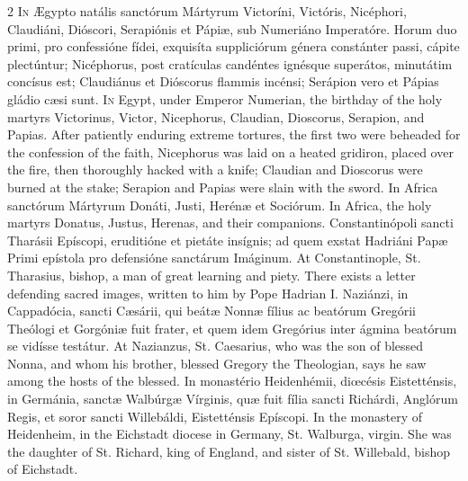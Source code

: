 \begin{paracol}{2}
\lettrine[lines=2]{I}{n} Ægypto natális sanctórum Mártyrum Victoríni, 
 Victóris, Nicéphori, Claudiáni, Dióscori, Serapiónis et Pápiæ, sub Numeriáno 
 Imperatóre. Horum duo primi, pro confessióne fídei, exquisíta 
 suppliciórum génera constánter passi, cápite plectúntur; Nicéphorus, post 
 cratículas candéntes ignésque superátos, minutátim concísus est; Claudiánus 
 et Dióscorus flammis incénsi; Serápion vero et Pápias gládio cæsi sunt.
\switchcolumn
{}
\lettrine[lines=2]{I}{n} Egypt, under Emperor Numerian, the birthday of the holy martyrs 
 Victorinus, Victor, Nicephorus, Claudian, Dioscorus, Serapion, and Papias. 
 After patiently enduring extreme tortures, the first two were beheaded for 
 the confession of the faith, Nicephorus was laid on a heated gridiron, 
 placed over the fire, then thoroughly hacked with a knife; Claudian and 
 Dioscorus were burned at the stake; Serapion and Papias were slain with the 
 sword.
\switchcolumn*
{}
In Africa sanctórum Mártyrum Donáti, Justi, Herénæ 
 et Sociórum.
\switchcolumn
{}
In Africa, the holy martyrs Donatus, Justus, Herenas, and their companions.
\switchcolumn*
{}
Constantinópoli sancti Tharásii Epíscopi, eruditióne et pietáte insígnis; ad 
 quem exstat Hadriáni Papæ Primi epístola pro 
 defensióne sanctárum Imáginum.
\switchcolumn
{}
At Constantinople, St. Tharasius, bishop, a man of great learning and piety. 
 There exists a letter defending sacred images, written to him by Pope 
 Hadrian I.
\switchcolumn*
{}
Naziánzi, in Cappadócia, sancti Cæsárii, qui 
 beátæ Nonnæ fílius ac beatórum Gregórii Theólogi et Gorgóniæ fuit frater, et 
 quem idem Gregórius inter ágmina beatórum se vidísse testátur.
\switchcolumn
{}
At Nazianzus, St. Caesarius, who was the son of blessed Nonna, and whom his 
 brother, blessed Gregory the Theologian, says he saw among the hosts of the 
 blessed.
\switchcolumn*
{}
In monastério Heidenhémii, diœcésis 
 Eistetténsis, in Germánia, sanctæ Walbúrgæ Vírginis, quæ fuit fília sancti 
 Richárdi, Anglórum Regis, et soror sancti Willebáldi, Eistetténsis Epíscopi.
\switchcolumn
{}
In the monastery of Heidenheim, in the Eichstadt diocese in Germany, St. 
 Walburga, virgin. She was the daughter of St. Richard, king of 
 England, and sister of St. Willebald, bishop of Eichstadt.
\switchcolumn*
{}
\end{paracol}


